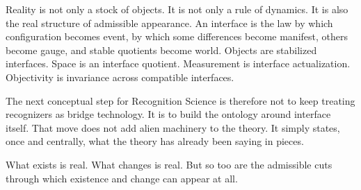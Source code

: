 \documentclass[11pt]{article}
\begin{document}
Reality is not only a stock of objects.
It is not only a rule of dynamics.
It is also the real structure of admissible appearance.
An interface is the law by which configuration becomes event, by which some differences become manifest, others become gauge, and stable quotients become world.
Objects are stabilized interfaces.
Space is an interface quotient.
Measurement is interface actualization.
Objectivity is invariance across compatible interfaces.

The next conceptual step for Recognition Science is therefore not to keep treating recognizers as bridge technology.
It is to build the ontology around interface itself.
That move does not add alien machinery to the theory.
It simply states, once and centrally, what the theory has already been saying in pieces.

What exists is real.
What changes is real.
But so too are the admissible cuts through which existence and change can appear at all.
\end{document}
